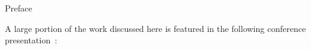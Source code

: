 \begin{plainchp}{Preface}
    \lipsum[1]

    A large portion of the work discussed here is featured in the following conference presentation~\cite{dubeLaserSustainedPlasmaDeep2024}:\\
\end{plainchp}